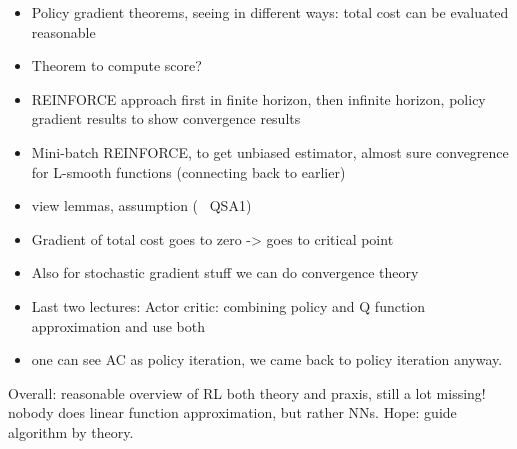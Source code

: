 \begin{itemize}
    \item Policy gradient theorems, seeing in different ways: total cost can be evaluated reasonable 
    \item Theorem to compute score?
    \item REINFORCE approach first in finite horizon, then infinite horizon, policy gradient results to show convergence results 
    \item Mini-batch REINFORCE, to get unbiased estimator, almost sure convegrence for L-smooth functions (connecting back to earlier)
    \item view lemmas, assumption (~ QSA1)
    \item Gradient of total cost goes to zero -> goes to critical point
    \item Also for stochastic gradient stuff we can do convergence theory 
    \item Last two lectures: Actor critic: combining policy and Q function approximation and use both 
    \item one can see AC as policy iteration, we came back to policy iteration anyway.
\end{itemize}

Overall: reasonable overview of RL both theory and praxis, still a lot missing! nobody does linear function approximation, but rather NNs.
Hope: guide algorithm by theory.


















